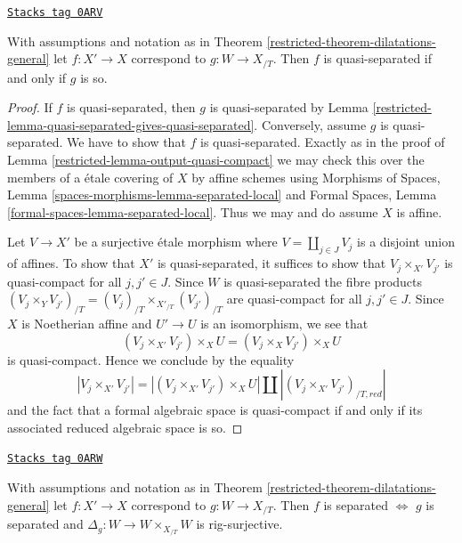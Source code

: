 \begin{lemma}
\label{restricted-lemma-output-quasi-separated}
\href{https://stacks.math.columbia.edu/tag/0ARV}{\texttt{Stacks tag 0ARV}}

With assumptions and notation as in Theorem \ref{restricted-theorem-dilatations-general}
let $f : X' \to X$ correspond to $g : W \to X_{/T}$.
Then $f$ is quasi-separated if and only if $g$ is so.
\end{lemma}

\begin{proof}

If $f$ is quasi-separated, then $g$ is quasi-separated by
Lemma \ref{restricted-lemma-quasi-separated-gives-quasi-separated}.
Conversely, assume $g$ is quasi-separated. We have to show
that $f$ is quasi-separated. Exactly as in the proof
of Lemma \ref{restricted-lemma-output-quasi-compact} we may check
this over the members of a \'etale covering of $X$ by affine schemes
using Morphisms of Spaces, Lemma
\ref{spaces-morphisms-lemma-separated-local}
and Formal Spaces, Lemma
\ref{formal-spaces-lemma-separated-local}.
Thus we may and do assume $X$ is affine.

\medskip\noindent
Let $V \to X'$ be a surjective \'etale morphism
where $V = \coprod_{j \in J} V_j$ is a disjoint union of affines.
To show that $X'$ is quasi-separated, it suffices to show that
$V_j \times_{X'} V_{j'}$ is quasi-compact for all $j, j' \in J$.
Since $W$ is quasi-separated the fibre products
$(V_j \times_Y V_{j'})_{/T} = (V_j)_{/T} \times_{X'_{/T}} (V_{j'})_{/T}$
are quasi-compact for all $j, j' \in J$. Since $X$ is Noetherian affine
and $U' \to U$ is an isomorphism, we see that
$$
(V_j \times_{X'} V_{j'}) \times_X U =
(V_j \times_X V_{j'}) \times_X U
$$
is quasi-compact. Hence we conclude by the equality
$$
|V_j \times_{X'} V_{j'}| =
|(V_j \times_{X'} V_{j'}) \times_X U| \amalg
|(V_j \times_{X'} V_{j'})_{/T, red}|
$$
and the fact that a formal algebraic space is quasi-compact if and
only if its associated reduced algebraic space is so.
\end{proof}

\begin{lemma}
\label{restricted-lemma-output-separated}
\href{https://stacks.math.columbia.edu/tag/0ARW}{\texttt{Stacks tag 0ARW}}

With assumptions and notation as in Theorem \ref{restricted-theorem-dilatations-general}
let $f : X' \to X$ correspond to $g : W \to X_{/T}$.
Then $f$ is separated $\Leftrightarrow$ $g$ is
separated and $\Delta_g : W \to W \times_{X_{/T}} W$ is rig-surjective.
\end{lemma}

